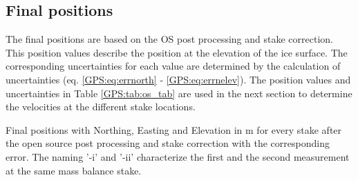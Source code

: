 \subsection{Final positions}

The final positions are based on the OS post processing and stake correction.
This position values describe the position at the elevation of the ice surface. 
The corresponding uncertainties for each value are determined by the calculation of uncertainties (eq. \ref{GPS:eq:errnorth} - \ref{GPS:eq:errnelev}). 
The position values and uncertainties in Table \ref{GPS:tab:os_tab} are used in the next section to determine the velocities at the different stake locations. 

\begin{table}[H]
	\caption{Final positions with Northing, Easting and Elevation in m for every stake after the open source post processing and stake correction with the corresponding error. The naming '-i' and '-ii' characterize the first and the second measurement at the same mass balance stake.}
	\centering
	
	\label{GPS:tab:os_tab}
\end{table}
